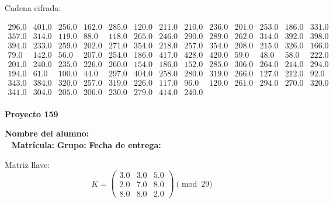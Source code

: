 \documentclass[12pt]{article}
\begin{document}
Cadena cifrada:
\begin{center}
$\begin{array}{lllllllllllll}
296.0 & 401.0 & 256.0 & 162.0 & 285.0 & 120.0 & 211.0 & 210.0 & 236.0 & 201.0 & 253.0 & 186.0 & 331.0\\
357.0 & 314.0 & 119.0 & 88.0 & 118.0 & 265.0 & 246.0 & 290.0 & 289.0 & 262.0 & 314.0 & 392.0 & 398.0\\
394.0 & 233.0 & 259.0 & 202.0 & 271.0 & 354.0 & 218.0 & 257.0 & 354.0 & 208.0 & 215.0 & 326.0 & 166.0\\
79.0 & 142.0 & 56.0 & 207.0 & 254.0 & 186.0 & 417.0 & 428.0 & 420.0 & 59.0 & 48.0 & 58.0 & 222.0\\
201.0 & 240.0 & 235.0 & 226.0 & 260.0 & 154.0 & 186.0 & 152.0 & 285.0 & 306.0 & 264.0 & 214.0 & 294.0\\
194.0 & 61.0 & 100.0 & 44.0 & 297.0 & 404.0 & 258.0 & 280.0 & 319.0 & 266.0 & 127.0 & 212.0 & 92.0\\
343.0 & 384.0 & 320.0 & 257.0 & 319.0 & 226.0 & 117.0 & 96.0 & 120.0 & 261.0 & 294.0 & 270.0 & 320.0\\
341.0 & 304.0 & 205.0 & 206.0 & 230.0 & 279.0 & 414.0 & 240.0\\
\end{array}$
\end{center}

\newpage


\textbf{Proyecto 159}

\textbf{Nombre del alumno:} \underline{\hspace{13cm}}\\\
\vspace{1cm}
\textbf{Matrícula:} \underline{\hspace{4cm}} \hspace{1cm}
\textbf{Grupo:} \underline{\hspace{2cm}}
\textbf{Fecha de entrega:} \underline{\hspace{2cm}}

\medskip

Matriz llave:
\[
K = \begin{pmatrix}
3.0 & 3.0 & 5.0\\
2.0 & 7.0 & 8.0\\
8.0 & 8.0 & 2.0
\end{pmatrix} \pmod{29}
\]
\end{document}

